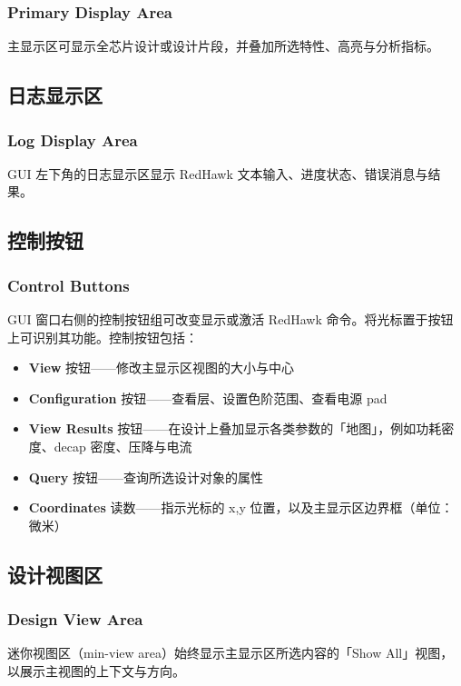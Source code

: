 \subsubsection*{Primary Display Area}

主显示区可显示全芯片设计或设计片段，并叠加所选特性、高亮与分析指标。

\subsection{日志显示区}
\subsubsection*{Log Display Area}

GUI 左下角的日志显示区显示 RedHawk 文本输入、进度状态、错误消息与结果。

\subsection{控制按钮}
\subsubsection*{Control Buttons}

GUI 窗口右侧的控制按钮组可改变显示或激活 RedHawk 命令。将光标置于按钮上可识别其功能。控制按钮包括：
\begin{itemize}
  \item \textbf{View} 按钮——修改主显示区视图的大小与中心
  \item \textbf{Configuration} 按钮——查看层、设置色阶范围、查看电源 pad
  \item \textbf{View Results} 按钮——在设计上叠加显示各类参数的「地图」，例如功耗密度、decap 密度、压降与电流
  \item \textbf{Query} 按钮——查询所选设计对象的属性
  \item \textbf{Coordinates} 读数——指示光标的 x,y 位置，以及主显示区边界框（单位：微米）
\end{itemize}

\subsection{设计视图区}
\subsubsection*{Design View Area}

迷你视图区（min-view area）始终显示主显示区所选内容的「Show All」视图，以展示主视图的上下文与方向。

